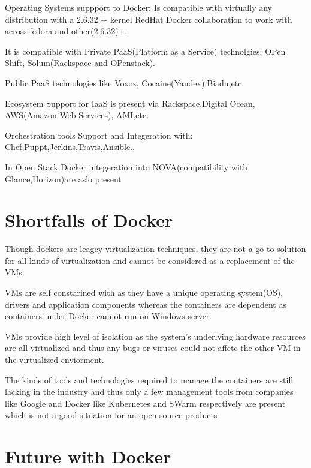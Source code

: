 \documentclass[9pt,twocolumn,twoside]{styles/osajnl}
\begin{document}
Operating Systems suppport to Docker: Is compatible with virtually
any distribution with a 2.6.32 + kernel RedHat Docker collaboration to
work with across fedora and other(2.6.32)+.

It is compatible with Private PaaS(Platform as a Service) technolgies:
OPen Shift, Solum(Rackspace and OPenstack).

Public PaaS technologies like Voxoz, Cocaine(Yandex),Biadu,etc.

Ecosystem Support for IaaS is present via Rackspace,Digital Ocean,
AWS(Amazon Web Services), AMI,etc.

Orchestration tools Support and Integeration with:
Chef,Puppt,Jerkins,Travis,Ansible..

In Open Stack Docker integeration into NOVA(compatibility with
Glance,Horizon)are aslo present

\section{Shortfalls of Docker}

Though dockers are leagcy virtualization techniques, they are not a go
to solution for all kinds of virtualization and cannot be considered
as a replacement of the VMs.

VMs are self constarined with as they have a unique operating
system(OS), drivers and application components whereas the containers
are dependent as containers under Docker cannot run on Windows server.

VMs provide high level of isolation as the system's underlying
hardware resources are all virtualized and thus any bugs or viruses
could not affetc the other VM in the virtualized enviorment.

The kinds of tools and technologies required to manage the containers
are still lacking in the industry and thus only a few management tools
from companies like Google and Docker like Kubernetes and SWarm
respectively are present which is not a good situation for an
open-source products

\section{Future with Docker}
\end{document}
